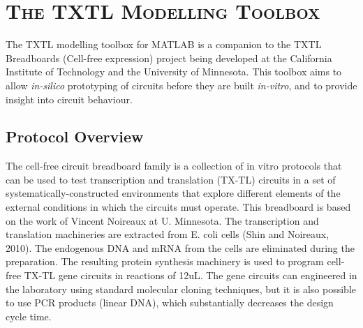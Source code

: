 \chapter{\textsc{The TXTL Modelling Toolbox}}

The TXTL modelling toolbox for MATLAB is a companion to the TXTL Breadboards (Cell-free expression) project being developed at the California Institute of Technology and the University of Minnesota. This toolbox aims to allow \textit{in-silico} prototyping of circuits before they are built \textit{in-vitro}, and to provide insight into circuit behaviour. 

\section{Protocol Overview}

The cell-free circuit breadboard family is a collection of in vitro
protocols that can be used to test transcription and translation
(TX-TL) circuits in a set of systematically-constructed environments
that explore different elements of the external conditions in which
the circuits must operate. This breadboard is based on the work of
Vincent Noireaux at U. Minnesota. The transcription and translation
machineries are extracted from E. coli cells (Shin and Noireaux,
2010). The endogenous DNA and mRNA from the cells are eliminated
during the preparation. The resulting protein synthesis machinery is
used to program cell-free TX-TL gene circuits in reactions of
12uL. The gene circuits can engineered in the laboratory using
standard molecular cloning techniques, but it is also possible to use
PCR products (linear DNA), which substantially decreases the design
cycle time. 

\begin{comment}
\subsection{The TXTL Experimental Protocol}

The endogenous Escherichia coli based TX-TL cell-free expression
system described here is an easy-to-run three-tube reaction that can
take less than 8 hours to set-up, collect, and interpret data. 

\subsection{The TXTL Modelling Protocol}
\end{comment}

